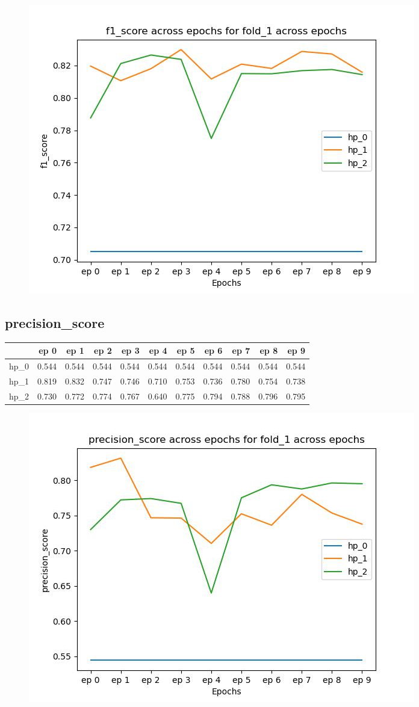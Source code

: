 \documentclass{article}
\begin{document}
\begin{figure}[H]
\includegraphics[scale = 0.75]{fold_1/f1_score}
\end{figure}
\subsection{precision\_score}
\begin{tabular}{lrrrrrrrrrr}
\toprule
{} &   ep 0 &   ep 1 &   ep 2 &   ep 3 &   ep 4 &   ep 5 &   ep 6 &   ep 7 &   ep 8 &   ep 9 \\
\midrule
hp\_0 &  0.544 &  0.544 &  0.544 &  0.544 &  0.544 &  0.544 &  0.544 &  0.544 &  0.544 &  0.544 \\
hp\_1 &  0.819 &  0.832 &  0.747 &  0.746 &  0.710 &  0.753 &  0.736 &  0.780 &  0.754 &  0.738 \\
hp\_2 &  0.730 &  0.772 &  0.774 &  0.767 &  0.640 &  0.775 &  0.794 &  0.788 &  0.796 &  0.795 \\
\bottomrule
\end{tabular}

\begin{figure}[H]
\includegraphics[scale = 0.75]{fold_1/precision_score}
\end{figure}
\end{document}
